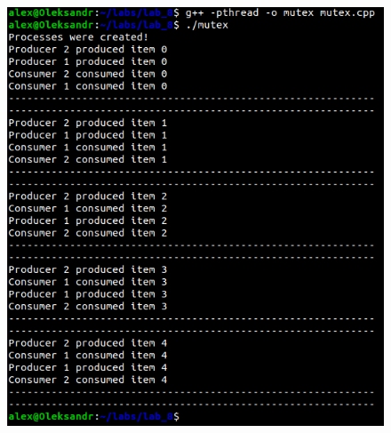 \documentclass[a4paper,12pt]{article}
\begin{document}
\newpage
    \begin{figure}[h!]
        \begin{minipage}[h]{1\linewidth}
            \centering
            \includegraphics[width=0.8\linewidth]{Prt sc/Figure_2.png}  
        \end{minipage}
    \end{figure}
\end{document}
